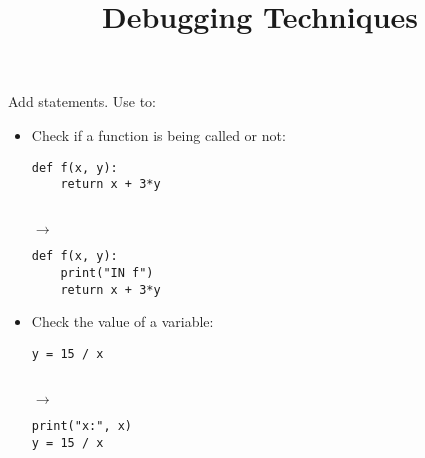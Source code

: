 \documentclass{poster}
\title{Debugging Techniques}
\begin{document}
\section{}

Add  statements. Use to:

\begin{itemize}

\item Check if a function is being called or not: \\
\noindent
\begin{minipage}[t]{0.45\columnwidth}
\begin{lstlisting}
def f(x, y):
    return x + 3*y
\end{lstlisting}
\end{minipage}
\begin{minipage}[t]{0.05\columnwidth}
\  \\
\hspace*{1ex}$\rightarrow$
\end{minipage}
\begin{minipage}[t]{0.45\columnwidth}
\begin{lstlisting}
def f(x, y):
    print("IN f")
    return x + 3*y
\end{lstlisting}
\end{minipage}

\item Check the value of a variable: \\
\noindent
\begin{minipage}[t]{0.45\columnwidth}
\begin{lstlisting}
y = 15 / x
\end{lstlisting}
\end{minipage}
\begin{minipage}[t]{0.05\columnwidth}
\  \\
\hspace*{1ex}$\rightarrow$
\end{minipage}
\begin{minipage}[t]{0.45\columnwidth}
\begin{lstlisting}
print("x:", x)
y = 15 / x
\end{lstlisting}
\end{minipage}


\end{itemize}
\end{document}
